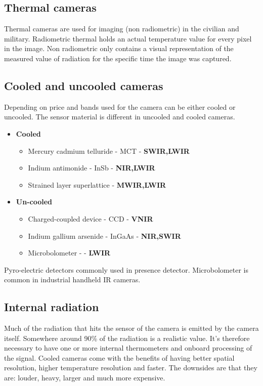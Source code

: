 	\subsection*{Thermal cameras}
	Thermal cameras are used for imaging (non radiometric) in the civilian and military. Radiometric thermal holds an actual temperature value for every pixel in the image. Non radiometric only contains a visual representation of the measured value of radiation for the specific time the image was captured. 

	\subsection*{Cooled and uncooled cameras}
	Depending on price and bands used for the camera can be either cooled or uncooled. The sensor material is different in uncooled and cooled cameras.

	\begin{itemize}
		\item \textbf{Cooled}
		\begin{itemize}
			\item Mercury cadmium telluride - MCT - \textbf{SWIR,LWIR}
			\item Indium antimonide - InSb - \textbf{NIR,LWIR}
			\item Strained layer superlattice - \textbf{MWIR,LWIR} 
		\end{itemize}
		\item \textbf{Un-cooled}
		\begin{itemize}
			\item Charged-coupled device - CCD - \textbf{VNIR}
			\item Indium gallium arsenide - InGaAs - \textbf{NIR,SWIR}
			\item Microbolometer - - \textbf{LWIR}
		\end{itemize}
	\end{itemize}

	
	Pyro-electric detectors commonly used in presence detector. Microbolometer is common in industrial handheld IR cameras.

	\subsection*{Internal radiation}
	Much of the radiation that hits the sensor of the camera is emitted by the camera itself. Somewhere around 90\% of the radiation is a realistic value. It's therefore necessary to have one or more internal thermometers and onboard processing of the signal. Cooled cameras come with the benefits of having better spatial resolution, higher temperature resolution and faster. The downsides are that they are: louder, heavy, larger and much more expensive.  

